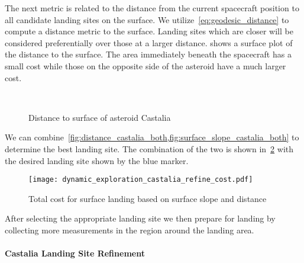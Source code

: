 \documentclass[smallextended]{svjour3}       %
\begin{document}
The next metric is related to the distance from the current spacecraft position to all candidate landing sites on the surface.
We utilize~\cref{eq:geodesic_distance} to compute a distance metric to the surface.
Landing sites which are closer will be considered preferentially over those at a larger distance.
 shows a surface plot of the distance to the surface. 
The area immediately beneath the spacecraft has a small cost while those on the opposite side of the asteroid have a much larger cost.
\begin{figure}[htbp]
    \centering
    \\
    \caption{Distance to surface of asteroid Castalia\label{fig:distance_castalia_both}}
\end{figure}
We can combine~\cref{fig:distance_castalia_both,fig:surface_slope_castalia_both} to determine the best landing site. 
The combination of the two is shown in~\cref{fig:landing_site_cost} with the desired landing site shown by the blue marker.
\begin{figure}[htbp]
    \centering
    \texttt{[image: dynamic\_exploration\_castalia\_refine\_cost.pdf]}
    \caption{Total cost for surface landing based on surface slope and distance\label{fig:landing_site_cost}}
\end{figure}
After selecting the appropriate landing site we then prepare for landing by collecting more measurements in the region around the landing area.


\paragraph{Castalia Landing Site Refinement}

\end{document}
